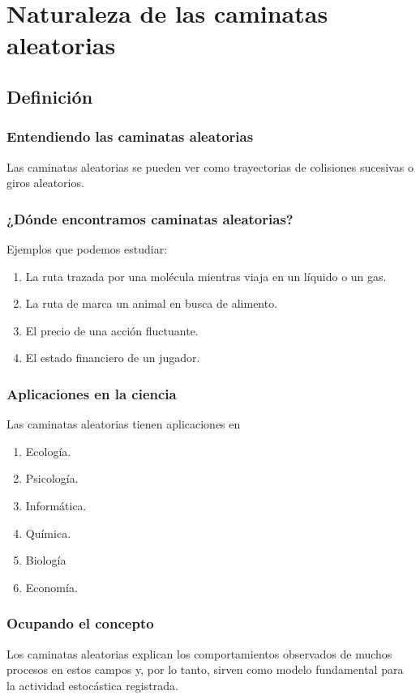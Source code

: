 \documentclass[12pt]{beamer}
\begin{document}
\section{Naturaleza de las caminatas aleatorias}
\subsection{Definición}

\begin{frame}
\frametitle{Entendiendo las caminatas aleatorias}
Las caminatas aleatorias se pueden ver como trayectorias de colisiones sucesivas o giros aleatorios.
\end{frame}
\begin{frame}
\frametitle{¿Dónde encontramos caminatas aleatorias?}
Ejemplos que podemos estudiar:
\pause
{}
\begin{enumerate}[<+->]
\item La ruta trazada por una molécula mientras viaja en un líquido o un gas.
\item La ruta de marca un animal en busca de alimento.
\item El precio de una acción fluctuante.
\item El estado financiero de un jugador.
\end{enumerate}
\end{frame}
\begin{frame}
\frametitle{Aplicaciones en la ciencia}
Las caminatas aleatorias tienen aplicaciones en
\begin{enumerate}[<+->]
\item Ecología.
\item Psicología.
\item Informática.
\item Química.
\item Biología
\item Economía.
\end{enumerate} 
\end{frame}
\begin{frame}
\frametitle{Ocupando el concepto}
Los caminatas aleatorias explican los comportamientos observados de muchos procesos en estos campos \pause y, por lo tanto, sirven como modelo fundamental para la actividad estocástica registrada.
\end{frame}
\end{document}
